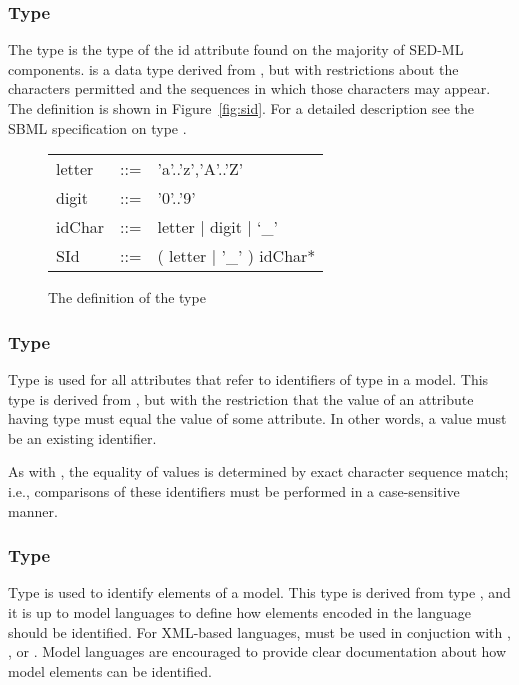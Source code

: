 \subsubsection[\element{SId}]{Type }
\label{type:sid}
The type  is the type of the id attribute found on the majority of SED-ML components.  is a data type derived from , but with restrictions about the characters permitted and the sequences in which those characters may appear. The definition is shown in Figure~\vref{fig:sid}. For a detailed description see the SBML specification on type  \citep{HBH+10}.

\begin{figure}[hbt]
  \ttfamily
  \small
  \centering
  \begin{tabular}{lll}
    letter & ::= & 'a'..'z','A'..'Z'\\
    digit  & ::= & '0'..'9'\\
    idChar & ::= & letter | digit | `\_'\\
    SId    & ::= & ( letter | '\_' ) idChar*\\
  \end{tabular}
  \vspace*{-1ex}
  \caption{The definition of the type }
  \label{fig:sid}
\end{figure}

\subsubsection[\SIdRef]{Type \SIdRef}
\label{type:sidref}
Type  is used for all attributes that refer to identifiers of type \SId in a model. This type is derived from \SId, but with the restriction that the value of an attribute having type  must equal the value of some \SId attribute. In other words, a  value must be an existing identifier.

As with \SId, the equality of  values is determined by exact character sequence match; i.e., comparisons of these identifiers must be performed in a case-sensitive manner.

\subsubsection[\element{TargetType}]{Type }
\label{type:target}
Type  is used to identify elements of a model.  This type is derived from type , and it is up to model languages to define how elements encoded in the language should be identified.  For XML-based languages,  must be used in conjuction with \ChangeXML, \AddXML, or \RemoveXML. Model languages are encouraged to provide clear documentation about how model elements can be identified.

